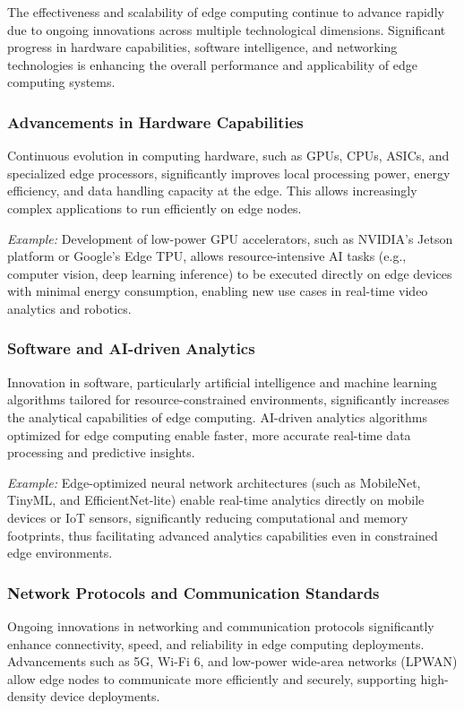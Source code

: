 \documentclass[runningheads]{llncs}
\begin{document}
The effectiveness and scalability of edge computing continue to advance rapidly due to ongoing innovations across multiple technological dimensions. Significant progress in hardware capabilities, software intelligence, and networking technologies is enhancing the overall performance and applicability of edge computing systems.

\subsubsection{Advancements in Hardware Capabilities}
Continuous evolution in computing hardware, such as GPUs, CPUs, ASICs, and specialized edge processors, significantly improves local processing power, energy efficiency, and data handling capacity at the edge. This allows increasingly complex applications to run efficiently on edge nodes.

\noindent\textit{Example:} Development of low-power GPU accelerators, such as NVIDIA's Jetson platform or Google's Edge TPU, allows resource-intensive AI tasks (e.g., computer vision, deep learning inference) to be executed directly on edge devices with minimal energy consumption, enabling new use cases in real-time video analytics and robotics.

\subsubsection{Software and AI-driven Analytics}
Innovation in software, particularly artificial intelligence and machine learning algorithms tailored for resource-constrained environments, significantly increases the analytical capabilities of edge computing. AI-driven analytics algorithms optimized for edge computing enable faster, more accurate real-time data processing and predictive insights.

\noindent\textit{Example:} Edge-optimized neural network architectures (such as MobileNet, TinyML, and EfficientNet-lite) enable real-time analytics directly on mobile devices or IoT sensors, significantly reducing computational and memory footprints, thus facilitating advanced analytics capabilities even in constrained edge environments.

\subsubsection{Network Protocols and Communication Standards}
Ongoing innovations in networking and communication protocols significantly enhance connectivity, speed, and reliability in edge computing deployments. Advancements such as 5G, Wi-Fi 6, and low-power wide-area networks (LPWAN) allow edge nodes to communicate more efficiently and securely, supporting high-density device deployments.
\end{document}

